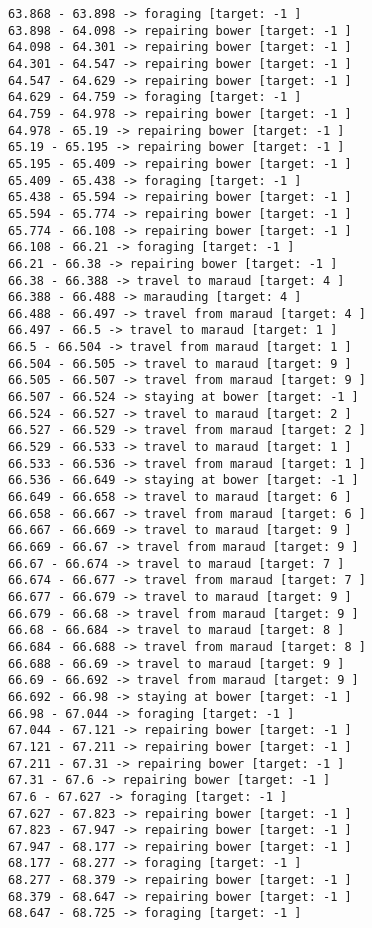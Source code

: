 \documentclass[11pt]{article}
\begin{document}
\begin{Verbatim}[commandchars=\\\{\}]
63.868 - 63.898 -> foraging [target: -1 ]
63.898 - 64.098 -> repairing bower [target: -1 ]
64.098 - 64.301 -> repairing bower [target: -1 ]
64.301 - 64.547 -> repairing bower [target: -1 ]
64.547 - 64.629 -> repairing bower [target: -1 ]
64.629 - 64.759 -> foraging [target: -1 ]
64.759 - 64.978 -> repairing bower [target: -1 ]
64.978 - 65.19 -> repairing bower [target: -1 ]
65.19 - 65.195 -> repairing bower [target: -1 ]
65.195 - 65.409 -> repairing bower [target: -1 ]
65.409 - 65.438 -> foraging [target: -1 ]
65.438 - 65.594 -> repairing bower [target: -1 ]
65.594 - 65.774 -> repairing bower [target: -1 ]
65.774 - 66.108 -> repairing bower [target: -1 ]
66.108 - 66.21 -> foraging [target: -1 ]
66.21 - 66.38 -> repairing bower [target: -1 ]
66.38 - 66.388 -> travel to maraud [target: 4 ]
66.388 - 66.488 -> marauding [target: 4 ]
66.488 - 66.497 -> travel from maraud [target: 4 ]
66.497 - 66.5 -> travel to maraud [target: 1 ]
66.5 - 66.504 -> travel from maraud [target: 1 ]
66.504 - 66.505 -> travel to maraud [target: 9 ]
66.505 - 66.507 -> travel from maraud [target: 9 ]
66.507 - 66.524 -> staying at bower [target: -1 ]
66.524 - 66.527 -> travel to maraud [target: 2 ]
66.527 - 66.529 -> travel from maraud [target: 2 ]
66.529 - 66.533 -> travel to maraud [target: 1 ]
66.533 - 66.536 -> travel from maraud [target: 1 ]
66.536 - 66.649 -> staying at bower [target: -1 ]
66.649 - 66.658 -> travel to maraud [target: 6 ]
66.658 - 66.667 -> travel from maraud [target: 6 ]
66.667 - 66.669 -> travel to maraud [target: 9 ]
66.669 - 66.67 -> travel from maraud [target: 9 ]
66.67 - 66.674 -> travel to maraud [target: 7 ]
66.674 - 66.677 -> travel from maraud [target: 7 ]
66.677 - 66.679 -> travel to maraud [target: 9 ]
66.679 - 66.68 -> travel from maraud [target: 9 ]
66.68 - 66.684 -> travel to maraud [target: 8 ]
66.684 - 66.688 -> travel from maraud [target: 8 ]
66.688 - 66.69 -> travel to maraud [target: 9 ]
66.69 - 66.692 -> travel from maraud [target: 9 ]
66.692 - 66.98 -> staying at bower [target: -1 ]
66.98 - 67.044 -> foraging [target: -1 ]
67.044 - 67.121 -> repairing bower [target: -1 ]
67.121 - 67.211 -> repairing bower [target: -1 ]
67.211 - 67.31 -> repairing bower [target: -1 ]
67.31 - 67.6 -> repairing bower [target: -1 ]
67.6 - 67.627 -> foraging [target: -1 ]
67.627 - 67.823 -> repairing bower [target: -1 ]
67.823 - 67.947 -> repairing bower [target: -1 ]
67.947 - 68.177 -> repairing bower [target: -1 ]
68.177 - 68.277 -> foraging [target: -1 ]
68.277 - 68.379 -> repairing bower [target: -1 ]
68.379 - 68.647 -> repairing bower [target: -1 ]
68.647 - 68.725 -> foraging [target: -1 ]

\end{Verbatim}
\end{document}
